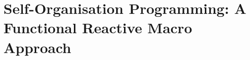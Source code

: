 

\theoremstyle{definition}
\newtheorem{example}{Example}
    
\newtheorem{theorem}{Theorem}
\chapter[Self-Organisation Programming]{
Self-Organisation Programming: A Functional Reactive Macro Approach
}
\minitoc%
%
%
%
% 
%


